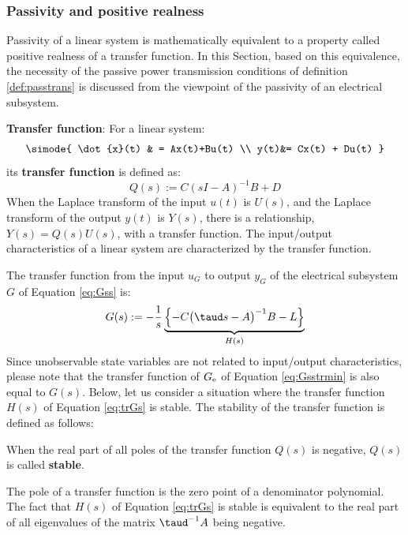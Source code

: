 \documentclass[graybox, envcountchap]{svmult}
\begin{document}
\smallskip
\subsubsection{Passivity and positive realness}

Passivity of a linear system is mathematically equivalent to a property called positive realness of a transfer function.
In this Section, based on this equivalence, the necessity of the passive power transmission conditions of definition \ref{def:passtrans} is discussed from the viewpoint of the passivity of an electrical subsystem.

\begin{COLUMN}
\noindent \textbf{Transfer function}:
For a linear system:
\begin{align*}
\simode{
\dot{x}(t) & = Ax(t)+Bu(t) \\
y(t)&= Cx(t) + Du(t)
}
\end{align*}
its \textbf{transfer function} is defined as:
\[
Q(s):=C(sI-A)^{-1}B +D
\]
When the Laplace transform of the input $u(t)$ is $U(s)$, and the Laplace transform of the output $y(t)$ is $Y(s)$, there is a relationship, $Y(s)=Q(s)U(s)$, with a transfer function.
The input/output characteristics of a linear system are characterized by the transfer function.
\end{COLUMN}


The transfer function from the input $u_G$ to output $y_G$ of the electrical subsystem $G$ of Equation
\ref{eq:Gss} is:
\begin{align}\label{eq:trGs}
G(s) :=  - \frac{1}{s} 
\underbrace{
\left\{ -C \bigl( \taud s -A \bigr)^{-1} B - L \right\}
}_{H(s)}
\end{align}
Since unobservable state variables are not related to input/output characteristics, please note that the transfer function of $G_{\rm e}$ of Equation \ref{eq:Gsstrmin} is also equal to $G(s)$.
Below, let us consider a situation where the transfer function $H(s)$ of Equation \ref{eq:trGs} is stable.
The stability of the transfer function is defined as follows:

\begin{definition}\label{def:trsta}
When the real part of all poles of the transfer function $Q(s)$ is negative, $Q(s)$ is called \textbf{stable}.
\end{definition}

The pole of a transfer function is the zero point of a denominator polynomial. The fact that $H(s)$ of Equation \ref{eq:trGs} is stable is equivalent to the
real part of all eigenvalues of the matrix $\taud^{-1}A$ being negative.
\end{document}
